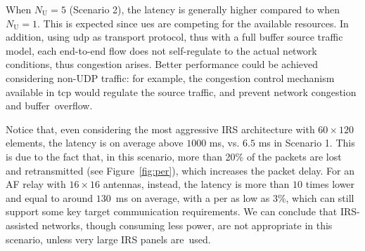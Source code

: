 When $N_{\mathrm U}=5$ (Scenario 2), the latency is generally higher compared to when $N_{\mathrm U}=1$. This is expected since \glspl{ue} are competing for the available resources. In addition, using \gls{udp} as transport protocol, thus with a full buffer source traffic model, each end-to-end flow does not self-regulate to the actual network conditions, thus congestion arises. 
Better performance could be achieved considering non-UDP traffic: for example, the congestion control mechanism available in \gls{tcp} would regulate the source traffic, and prevent network congestion and buffer~overflow.

Notice that, even considering the most aggressive IRS architecture with $60\times120$ elements, the latency is on average above $1000$ ms, vs. $6.5$ ms in Scenario 1. 
This is due to the fact that, in this scenario, more than 20\% of the packets are lost and retransmitted (see Figure~\ref{fig:per}), which increases the packet delay.
For an AF relay with $16\times16$ antennas, instead, the latency is more than $10$ times lower and equal to around $130$~ms on average, with a \gls{per} as low as 3\%, which can still support some key target communication requirements.
We can conclude that IRS-assisted networks, though consuming less power, are not appropriate in this scenario, unless very large IRS panels are~used.
	